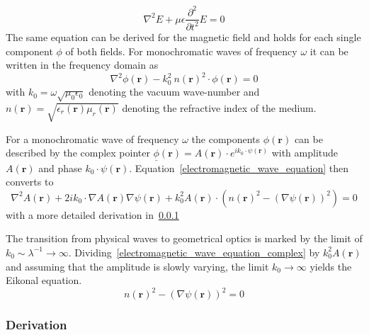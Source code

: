 \begin{equation}
    \nabla^2 E + \mu \epsilon \frac{\partial^2}{\partial t^2} E = 0
\end{equation}
The same equation can be derived for the magnetic field and holds for each single component \(\phi \) of both fields.
For monochromatic waves of frequency \(\omega \) it can be written in the frequency domain as
\begin{equation}\label{electromagnetic_wave_equation}
    \nabla^2 \phi(\mathbf{r}) - k_0^2\ n{(\mathbf{r})}^2 \cdot \phi(\mathbf{r}) = 0
\end{equation}
with \(k_0 = \omega \sqrt{\mu_0 \epsilon_0} \) denoting the vacuum wave-number and \(n(\mathbf{r}) = \sqrt{\epsilon_r(\mathbf{r}) \mu_r(\mathbf{r})}\) denoting the refractive index of the medium.

For a monochromatic wave of frequency \(\omega \) the components \(\phi(\mathbf{r})\) can be described by the complex pointer \(\underline{\phi}(\mathbf{r}) = A(\mathbf{r}) \cdot e^{i k_0 \cdot \psi(\mathbf{r})}\) with amplitude \(A(\mathbf{r})\) and phase \(k_0 \cdot \psi(\mathbf{r})\).
Equation~\eqref{electromagnetic_wave_equation} then converts to 
\begin{equation}\label{electromagnetic_wave_equation_complex}
    \nabla^2 A(\mathbf{r}) + 2ik_0 \cdot \nabla A(\mathbf{r}) \nabla \psi(\mathbf{r}) + k_0^2 A(\mathbf{r}) \cdot ({n(\mathbf{r})}^2 - {(\nabla \psi(\mathbf{r}))}^2) = 0
\end{equation}
with a more detailed derivation in~\ref{derivation}

The transition from physical waves to geometrical optics is marked by the limit of \(k_0 \sim  \lambda^{-1} \rightarrow \infty \).
Dividing~\eqref{electromagnetic_wave_equation_complex} by \(k_0^2 A(\mathbf{r})\) and assuming that the amplitude is slowly varying, the limit \(k_0 \rightarrow \infty \) yields the Eikonal equation.
\begin{equation}
    {n(\mathbf{r})}^2 - {(\nabla \psi(\mathbf{r}))}^2 = 0
\end{equation}












\subsubsection{Derivation}\label{derivation}

